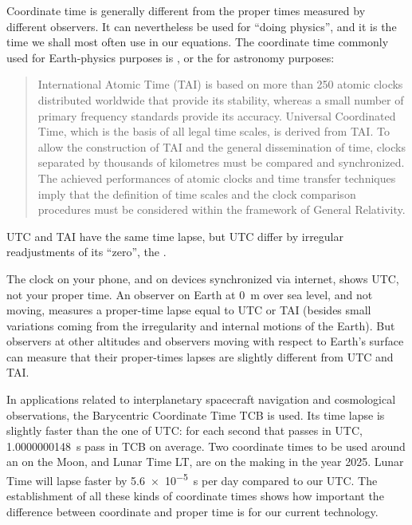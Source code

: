 \medskip

Coordinate time is generally different from the proper times measured by different observers. It can nevertheless be used for \enquote{doing physics}, and it is the time we shall most often use in our equations. The coordinate time commonly used for Earth-physics purposes is , or the  for astronomy purposes:
\begin{quote}\footnotesize
  International Atomic Time (TAI) is based on more than 250 atomic clocks distributed worldwide that provide its stability, whereas a small number of primary frequency standards provide its accuracy. Universal Coordinated Time, which is the basis of all legal time scales, is derived from TAI. To allow the construction of TAI and the general dissemination of time, clocks separated by thousands of kilometres must be compared and synchronized. \textelp{} The achieved performances of atomic clocks and time transfer techniques imply that the definition of time scales and the clock comparison procedures must be considered within the framework of General Relativity. 
\end{quote}
UTC and TAI have the same time lapse, but UTC differ by irregular readjustments of its \enquote{zero}, the .

The clock on your phone, and on devices synchronized via internet, shows UTC, not your proper time. An observer on Earth at \qty{0}{m} over sea level, and not moving, measures a proper-time lapse equal to UTC or TAI (besides small variations coming from the irregularity and internal motions of the Earth). But observers at other altitudes and observers moving with respect to Earth's surface can measure that their proper-times lapses are slightly different from UTC and TAI.

\medskip

In applications related to interplanetary spacecraft navigation and cosmological observations, the Barycentric Coordinate Time TCB is used. Its time lapse is slightly faster than the one of UTC: for each second that passes in UTC, \qty{1.0000000148}{s} pass in TCB on average. Two coordinate times to be used around an on the Moon,  and Lunar Time LT, are on the making in the year 2025. Lunar Time will lapse faster by \qty{5.6e-5}{s} per day compared to our UTC. The establishment of all these kinds of coordinate times shows how important the difference between coordinate and proper time is for our current technology.

